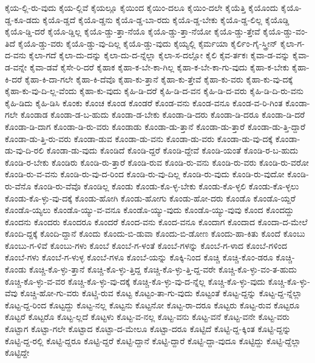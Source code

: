 {ಕೈಯ-ಲ್ಲಿ-ರು-ವುದು
ಕೈಯ-ಲ್ಲಿವೆ
ಕೈಯಲ್ಲೂ
ಕೈಯಿಂದ
ಕೈಯಿಂ-ದಲೂ
ಕೈಯಿಂ-ದಲೇ
ಕೈಯೆತ್ತಿ
ಕೈಯೊಂದು
ಕೈಯೊ-ಡ್ಡ-ಕೂ-ಡದು
ಕೈಯೊ-ಡ್ಡದೆ
ಕೈಯೊ-ಡ್ಡನು
ಕೈಯೊ-ಡ್ಡ-ಬಾ-ರದು
ಕೈಯೊ-ಡ್ಡ-ಬೇಕು
ಕೈಯೊ-ಡ್ಡ-ಲಿಲ್ಲ
ಕೈಯೊಡ್ಡಿ
ಕೈಯೊ-ಡ್ಡಿ-ದರೆ
ಕೈಯೊ-ಡ್ಡಿಲ್ಲ
ಕೈಯೊ-ಡ್ಡು-ತ್ತಾ-ನೆಯೊ
ಕೈಯೊ-ಡ್ಡು-ತ್ತಾ-ನೆಯೋ
ಕೈಯೊ-ಡ್ಡು-ತ್ತೇವೆ
ಕೈಯೊ-ಡ್ಡು-ವಂ-ತಿದೆ
ಕೈಯೊ-ಡ್ಡು-ವರು
ಕೈಯೊ-ಡ್ಡು-ವು-ದಿಲ್ಲ
ಕೈಯೊ-ಡ್ಡು-ವುದು
ಕೈಯ್ಯಲ್ಲಿ
ಕೈರ್ಮಯಾ
ಕೈರ್ಲಿಂ-ಗೈ-ಸ್ತ್ರೀನ್
ಕೈಲಾ-ಗ-ದ-ವನು
ಕೈಲಾ-ಗದೆ
ಕೈಲಾ-ದು-ದನ್ನು
ಕೈಲಾ-ದು-ದ-ನ್ನೆಲ್ಲಾ
ಕೈಲಾ-ಸ-ದಲ್ಲೋ
ಕೈಲಿ
ಕೈವ-ರ್ತಕಃ
ಕೈವಾ-ಡ-ವನ್ನು
ಕೈವಾ-ಡ-ವನ್ನೇ
ಕೈವಾ-ಡವೆ
ಕೈಸೇ-ರಿ-ದರೆ
ಕೈಹಾಕ
ಕೈಹಾ-ಕ-ಬೇ-ಕಾ-ಗಿಲ್ಲ
ಕೈಹಾ-ಕ-ಬೇ-ಕಾ-ಗು-ವುದು
ಕೈಹಾ-ಕ-ಬೇಕು
ಕೈಹಾ-ಕಿ-ದರೆ
ಕೈಹಾ-ಕಿ-ದಾ-ಗಲೇ
ಕೈಹಾ-ಕಿ-ದೆವೊ
ಕೈಹಾ-ಕು-ತ್ತಾನೆ
ಕೈಹಾ-ಕು-ತ್ತೇವೆ
ಕೈಹಾ-ಕು-ವರು
ಕೈಹಾ-ಕು-ವು-ದಕ್ಕೆ
ಕೈಹಾ-ಕು-ವು-ದಿ-ಲ್ಲ-ವೆಂದು
ಕೈಹಾ-ಕು-ವುದು
ಕೈಹಿ-ಡಿ-ದರೆ
ಕೈಹಿ-ಡಿ-ದ-ವನ
ಕೈಹಿ-ಡಿ-ದ-ವರು
ಕೈಹಿ-ಡಿ-ದಿ-ರು-ವನು
ಕೈಹಿ-ಡಿದು
ಕೈಹಿ-ಡಿಸಿ
ಕೊಂಕು
ಕೊಂಚ
ಕೊಂಡ
ಕೊಂಡರೆ
ಕೊಂಡ-ವನು
ಕೊಂಡ-ವನೂ
ಕೊಂಡ-ವ-ರಿ-ಗಿಂತ
ಕೊಂಡಾ-ಗಲೇ
ಕೊಂಡಾಡ
ಕೊಂಡಾ-ಡ-ಬ-ಹುದು
ಕೊಂಡಾ-ಡ-ಬೇಕು
ಕೊಂಡಾ-ಡಿ-ದರು
ಕೊಂಡಾ-ಡಿ-ದರೂ
ಕೊಂಡಾ-ಡಿ-ದರೆ
ಕೊಂಡಾ-ಡಿ-ದಾಗ
ಕೊಂಡಾ-ಡಿ-ರು-ವರು
ಕೊಂಡಾಡು
ಕೊಂಡಾ-ಡು-ತ್ತಾನೆ
ಕೊಂಡಾ-ಡು-ತ್ತಾರೆ
ಕೊಂಡಾ-ಡು-ತ್ತಿ-ದ್ದಾರೆ
ಕೊಂಡಾ-ಡು-ತ್ತಿ-ರು-ವರು
ಕೊಂಡಾ-ಡುವ
ಕೊಂಡಾ-ಡು-ವನು
ಕೊಂಡಾ-ಡು-ವರು
ಕೊಂಡಾ-ಡು-ವು-ದಕ್ಕೆ
ಕೊಂಡಾ-ಡು-ವು-ದಿ-ರಲಿ
ಕೊಂಡಾ-ಡು-ವುದು
ಕೊಂಡಿದೆ
ಕೊಂಡಿ-ದ್ದರೆ
ಕೊಂಡಿ-ದ್ದೇವೆ
ಕೊಂಡಿ-ಯಂತೆ
ಕೊಂಡಿ-ರ-ಬ-ಹುದು
ಕೊಂಡಿ-ರ-ಬೇಕು
ಕೊಂಡಿರು
ಕೊಂಡಿ-ರು-ತ್ತಾರೆ
ಕೊಂಡಿ-ರುವ
ಕೊಂಡಿ-ರು-ವನು
ಕೊಂಡಿ-ರು-ವರು
ಕೊಂಡಿ-ರು-ವರೋ
ಕೊಂಡಿ-ರು-ವ-ವನು
ಕೊಂಡಿ-ರು-ವು-ದ-ರಿಂದ
ಕೊಂಡಿ-ರು-ವು-ದಿಲ್ಲ
ಕೊಂಡಿ-ರು-ವುದು
ಕೊಂಡಿ-ರು-ವುದೋ
ಕೊಂಡಿ-ರು-ವೆನೊ
ಕೊಂಡಿ-ರು-ವೆವೊ
ಕೊಂಡಿಲ್ಲ
ಕೊಂಡು
ಕೊಂಡು-ಕೊ-ಳ್ಳ-ಬೇಕು
ಕೊಂಡು-ಕೊ-ಳ್ಳಲಿ
ಕೊಂಡು-ಕೊ-ಳ್ಳಲು
ಕೊಂಡು-ಕೊ-ಳ್ಳು-ವು-ದಕ್ಕೆ
ಕೊಂಡು-ಹೋಗಿ
ಕೊಂಡು-ಹೋಗು
ಕೊಂಡು-ಹೋ-ದರು
ಕೊಂಡೊ
ಕೊಂಡೊ-ಯ್ದರೆ
ಕೊಂಡೊ-ಯ್ಯಲು
ಕೊಂಡೊ-ಯ್ಯು-ವ-ವನೂ
ಕೊಂಡೊ-ಯ್ಯು-ವುದು
ಕೊಂಡೊ-ಯ್ಯು-ವುವು
ಕೊಂದ
ಕೊಂದದ್ದು
ಕೊಂದನು
ಕೊಂದರು
ಕೊಂದರೂ
ಕೊಂದರೆ
ಕೊಂದ-ವನು
ಕೊಂದ-ವನೂ
ಕೊಂದಾಗ
ಕೊಂದಾದ
ಕೊಂದಾ-ದ-ಮೇಲೆ
ಕೊಂದಿ-ದ್ದಕ್ಕೆ
ಕೊಂದಿ-ದ್ದಾನೆ
ಕೊಂದು
ಕೊಂದು-ಬಿ-ಡುವಾ
ಕೊಂದು-ಬಿ-ಡೋಣ
ಕೊಂದು-ಹಾ-ಕಿತು
ಕೊಂದೆ
ಕೊಂಬು
ಕೊಂಬು-ಗ-ಳಿವೆ
ಕೊಂಬು-ಗಳು
ಕೊಂಬೆ
ಕೊಂಬೆ-ಗ-ಳಂತೆ
ಕೊಂಬೆ-ಗಳನ್ನು
ಕೊಂಬೆ-ಗ-ಳಾದ
ಕೊಂಬೆ-ಗಳಿಂದ
ಕೊಂಬೆ-ಗಳು
ಕೊಂಬೆ-ಗ-ಳುಳ್ಳ
ಕೊಂಬೆ-ಗಳೂ
ಕೊಂಬೆ-ಯನ್ನು
ಕೊಕ್ಕಿ-ನಿಂದ
ಕೊಚ್ಚಿ
ಕೊಚ್ಚಿ-ಕೊಂ-ಡರೂ
ಕೊಚ್ಚಿ-ಕೊಂಡು
ಕೊಚ್ಚಿ-ಕೊ-ಳ್ಳು-ತ್ತಾನೆ
ಕೊಚ್ಚಿ-ಕೊ-ಳ್ಳು-ತ್ತಿದ್ದ
ಕೊಚ್ಚಿ-ಕೊ-ಳ್ಳು-ತ್ತಿ-ದ್ದ-ವರೇ
ಕೊಚ್ಚಿ-ಕೊ-ಳ್ಳು-ವಂ-ತ-ಹುದು
ಕೊಚ್ಚಿ-ಕೊ-ಳ್ಳು-ವ-ವರ
ಕೊಚ್ಚಿ-ಕೊ-ಳ್ಳು-ವು-ದಕ್ಕೆ
ಕೊಚ್ಚಿ-ಕೊ-ಳ್ಳು-ವು-ದ-ನ್ನೆಲ್ಲ
ಕೊಚ್ಚಿ-ಕೊ-ಳ್ಳು-ವುದು
ಕೊಚ್ಚಿ-ಕೊ-ಳ್ಳು-ವೆವು
ಕೊಚ್ಚಿ-ಹೋ-ಗು-ವರು
ಕೊಟ್ಚಿ-ರುವ
ಕೊಟ್ಟ
ಕೊಟ್ಟಂ-ತಾ-ಗು-ವುದು
ಕೊಟ್ಟಂತೆ
ಕೊಟ್ಟ-ದ್ದನ್ನು
ಕೊಟ್ಟ-ದ್ದ-ನ್ನೆಲ್ಲಾ
ಕೊಟ್ಟ-ದ್ದ-ರಿಂದ
ಕೊಟ್ಟದ್ದು
ಕೊಟ್ಟ-ನಲ್ಲ
ಕೊಟ್ಟನು
ಕೊಟ್ಟನೋ
ಕೊಟ್ಟ-ರಾ-ದರೂ
ಕೊಟ್ಟರು
ಕೊಟ್ಟ-ರುವ
ಕೊಟ್ಟರೂ
ಕೊಟ್ಟರೆ
ಕೊಟ್ಟರೊ
ಕೊಟ್ಟ-ಲ್ಲದೆ
ಕೊಟ್ಟಳು
ಕೊಟ್ಟ-ವ-ನಲ್ಲ
ಕೊಟ್ಟ-ವನು
ಕೊಟ್ಟ-ವನೆ
ಕೊಟ್ಟ-ವನೇ
ಕೊಟ್ಟ-ವರು
ಕೊಟ್ಟಾಗ
ಕೊಟ್ಟಾ-ಗಲೇ
ಕೊಟ್ಟಾದ
ಕೊಟ್ಟಾ-ದ-ಮೇಲೂ
ಕೊಟ್ಟಾ-ದರೂ
ಕೊಟ್ಟಿದೆ
ಕೊಟ್ಟಿ-ದ್ದ-ಕ್ಕಿಂತ
ಕೊಟ್ಟಿ-ದ್ದನ್ನು
ಕೊಟ್ಟಿ-ದ್ದ-ರಲ್ಲಿ
ಕೊಟ್ಟಿ-ದ್ದರೂ
ಕೊಟ್ಟಿ-ದ್ದರೆ
ಕೊಟ್ಟಿ-ದ್ದಾನೆ
ಕೊಟ್ಟಿ-ದ್ದಾರೆ
ಕೊಟ್ಟಿ-ದ್ದಾ-ವುದೂ
ಕೊಟ್ಟಿದ್ದು
ಕೊಟ್ಟಿ-ದ್ದೆಲ್ಲಾ
ಕೊಟ್ಟಿದ್ದೇ
}

